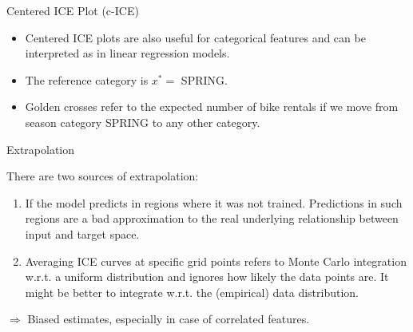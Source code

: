 \documentclass[11pt,compress,t,notes=noshow, aspectratio=169, xcolor=table]{beamer}
\begin{document}
\begin{frame}{Centered ICE Plot (c-ICE)}
\begin{itemize}
\item Centered ICE plots are also useful for categorical features and can be interpreted as in linear regression models.
\item The reference category is $x^* =$ SPRING.
\item Golden crosses refer to the expected number of bike rentals if we move from season category SPRING to any other category.
\end{itemize}

\end{frame}


%
%

\begin{frame}{Extrapolation}

There are two sources of extrapolation:
\lz
\begin{enumerate}
  \item If the model predicts in regions where it was not trained. Predictions in such regions are a bad approximation to the real underlying relationship between input and target space.
  \lz
  \item Averaging ICE curves at specific grid points refers to Monte Carlo integration w.r.t. a   uniform distribution and ignores how likely the data points are.
  It might be better to integrate w.r.t. the (empirical) data distribution.
\end{enumerate}
\lz
$\Rightarrow$ Biased estimates, especially in case of correlated features.

\framebreak



\end{frame}
\end{document}
